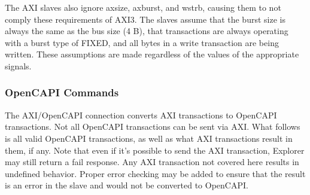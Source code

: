 The AXI slaves also ignore axsize, axburst, and wstrb, causing them to
not comply these requirements of AXI3. The slaves assume that the
burst size is always the same as the bus size (4 B), that transactions
are always operating with a burst type of FIXED, and all bytes in a
write transaction are being written. These assumptions are made
regardless of the values of the appropriate signals.

\subsubsection{OpenCAPI Commands}

The AXI/OpenCAPI connection converts AXI transactions to OpenCAPI
transactions. Not all OpenCAPI transactions can be sent via AXI. What
follows is all valid OpenCAPI transactions, as well as what AXI
transactions result in them, if any. Note that even if it's possible
to send the AXI transaction, Explorer may still return a fail
response. Any AXI transaction not covered here results in undefined
behavior. Proper error checking may be added to ensure that the result
is an error in the slave and would not be converted to OpenCAPI.

